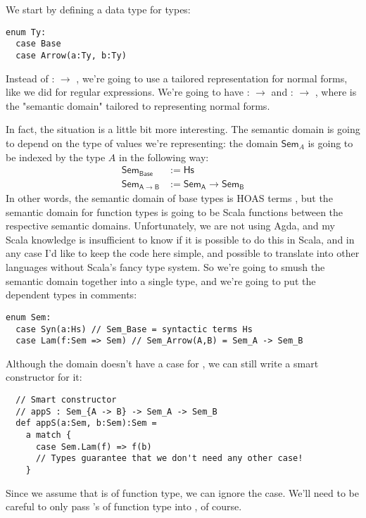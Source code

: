 We start by defining a data type for types:

\begin{lstlisting}
enum Ty:
  case Base
  case Arrow(a:Ty, b:Ty)
\end{lstlisting}

Instead of  :  $\to$ , we're going to use a tailored representation for normal forms, like we did for regular expressions.
We're going to have  :  $\to$  and  :  $\to$ , where  is the "semantic domain" tailored to representing normal forms.

In fact, the situation is a little bit more interesting.
The semantic domain is going to depend on the type of values we're representing: the domain $\mathsf{Sem}_A$ is going to be indexed by the type $A$ in the following way:
\begin{align*}
  \mathsf{Sem}_\mathsf{Base} &:= \mathsf{Hs} \\
  \mathsf{Sem}_{\mathsf{A} \to \mathsf{B}} &:= \mathsf{Sem}_\mathsf{A} \to \mathsf{Sem}_\mathsf{B}
\end{align*}
In other words, the semantic domain of base types is HOAS terms , but the semantic domain for function types is going to be Scala functions between the respective semantic domains.
Unfortunately, we are not using Agda, and my Scala knowledge is insufficient to know if it is possible to do this in Scala, and in any case I'd like to keep the code here simple, and possible to translate into other languages without Scala's fancy type system.
So we're going to smush the semantic domain together into a single type, and we're going to put the dependent types in comments:
\begin{lstlisting}
enum Sem:
  case Syn(a:Hs) // Sem_Base = syntactic terms Hs
  case Lam(f:Sem => Sem) // Sem_Arrow(A,B) = Sem_A -> Sem_B
\end{lstlisting}

Although the  domain doesn't have a case for , we can still write a smart constructor for it:

\begin{lstlisting}
  // Smart constructor
  // appS : Sem_{A -> B} -> Sem_A -> Sem_B
  def appS(a:Sem, b:Sem):Sem =
    a match {
      case Sem.Lam(f) => f(b)
      // Types guarantee that we don't need any other case!
    }
\end{lstlisting}

Since we assume that  is of function type, we can ignore the  case.
We'll need to be careful to only pass 's of function type into , of course.

